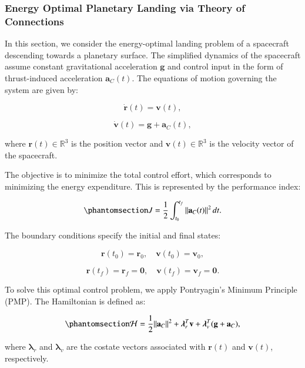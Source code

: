 \documentclass[
  number,
  preprint]{elsarticle}
\begin{document}
\subsubsection{Energy Optimal Planetary Landing via Theory of
Connections}\label{energy-optimal-planetary-landing-via-theory-of-connections}

In this section, we consider the energy-optimal landing problem of a
spacecraft descending towards a planetary surface. The simplified
dynamics of the spacecraft assume constant gravitational acceleration
\(\mathbf{g}\) and control input in the form of thrust-induced
acceleration \(\mathbf{a}_C(t)\). The equations of motion governing the
system are given by:

\[
\dot{\mathbf{r}}(t) = \mathbf{v}(t),
\]

\[
\dot{\mathbf{v}}(t) = \mathbf{g} + \mathbf{a}_C(t),
\]

where \(\mathbf{r}(t) \in \mathbb{R}^3\) is the position vector and
\(\mathbf{v}(t) \in \mathbb{R}^3\) is the velocity vector of the
spacecraft.

The objective is to minimize the total control effort, which corresponds
to minimizing the energy expenditure. This is represented by the
performance index:

\begin{equation}\protect\phantomsection\label{eq-ch4-j}{
J = \frac{1}{2} \int_{t_0}^{t_f} \|\mathbf{a}_C(t)\|^2 \, dt.
}\end{equation}

The boundary conditions specify the initial and final states:

\[
\mathbf{r}(t_0) = \mathbf{r}_0, \quad \mathbf{v}(t_0) = \mathbf{v}_0,
\]

\[
\mathbf{r}(t_f) = \mathbf{r}_f = \mathbf{0}, \quad \mathbf{v}(t_f) = \mathbf{v}_f = \mathbf{0}.
\]

To solve this optimal control problem, we apply Pontryagin's Minimum
Principle (PMP). The Hamiltonian is defined as:

\begin{equation}\protect\phantomsection\label{eq-ch4-hamiltonian}{
\mathcal{H} = \frac{1}{2} \|\mathbf{a}_C\|^2 + \boldsymbol{\lambda}_r^T \mathbf{v} + \boldsymbol{\lambda}_v^T (\mathbf{g} + \mathbf{a}_C),
}\end{equation}

where \(\boldsymbol{\lambda}_r\) and \(\boldsymbol{\lambda}_v\) are the
costate vectors associated with \(\mathbf{r}(t)\) and \(\mathbf{v}(t)\),
respectively.
\end{document}

